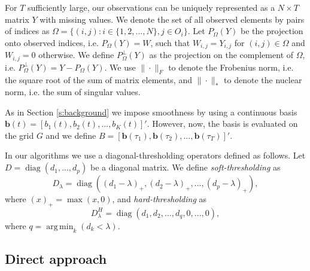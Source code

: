 \documentclass[preprint]{imsart}
\numberwithin{equation}{section}
\theoremstyle{plain}
\newcommand{\bb}{\mathbf{b}}
\DeclareMathOperator*{\argmin}{arg\,min}
\DeclareMathOperator*{\diag}{diag}
\begin{document}

For $T$ sufficiently large, our observations can be uniquely represented as a $N \times T$ matrix $Y$ with missing values. We denote the set of all observed elements by pairs of indices as $\Omega = \{ (i,j) : i\in \{1,2,...,N\}, j \in O_i \}$. Let $P_\Omega(Y)$ be the projection onto observed indices, i.e. $P_\Omega(Y) = W$, such that $W_{i,j} = Y_{i,j}$ for $(i,j) \in \Omega$ and $W_{i,j} = 0$ otherwise. We define $P^\perp_\Omega(Y)$ as the projection on the complement of $\Omega$, i.e. $P^\perp_\Omega(Y) = Y - P_\Omega(Y)$. We use $\|\cdot\|_F$ to denote the Frobenius norm, i.e. the square root of the sum of matrix elements, and $\|\cdot\|_*$ to denote the nuclear norm, i.e. the sum of singular values.

As in Section \ref{s:background} we impose smoothness by using a continuous basis $\bb(t) = [b_1(t),b_2(t),...,b_K(t)]'$. However, now, the basis is evaluated on the grid $G$ and we define $B = [\bb(\tau_1),\bb(\tau_2),...,\bb(\tau_T)]'$. %

In our algorithms we use a diagonal-thresholding operators defined as follows. Let $D = \diag(d_1,...,d_p)$ be a diagonal matrix. We define {\em soft-thresholding} as
\begin{equation*}
D_\lambda = \diag((d_1 - \lambda)_+,(d_2 - \lambda)_+,...,(d_p - \lambda)_+),\label{eq:thresholding}
\end{equation*}
where $(x)_+ = \max(x, 0)$, and {\em hard-thresholding} as
\begin{equation*}
D_\lambda^H = \diag(d_1,d_2,...,d_q,0,...,0),\label{eq:thresholding}
\end{equation*}
where $q = \argmin_k(d_k < \lambda)$.

\subsection{Direct approach}\label{ss:direct-matrix}
\end{document}
